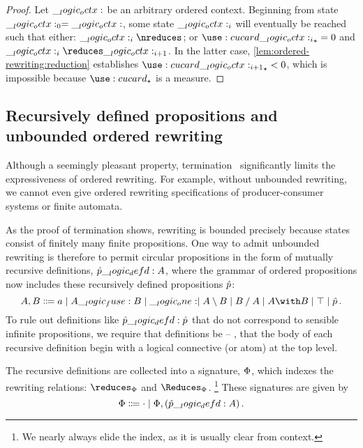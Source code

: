%
\begin{proof}
  Let $\__logic_octx:$ be an arbitrary ordered context.
  Beginning from state $\__logic_octx:_0 = \__logic_octx:$, some state $\__logic_octx:_i$ will eventually be reached such that either: $\octx_i \nreduces$; or $\card{\octx_i}_{\star} = 0$ and $\octx_i \reduces \octx_{i+1}$.
  In the latter case, \cref{lem:ordered-rewriting:reduction} establishes $\card{\octx_{i+1}}_{\star} < 0$, which is impossible because $\card{}_{\star}$ is a measure.
\end{proof}


\subsection{Recursively defined propositions and unbounded ordered rewriting}

Although a seemingly pleasant property, termination~ significantly limits the expressiveness of ordered rewriting.
For example, without unbounded rewriting, we cannot even give ordered rewriting specifications of producer-consumer systems or finite automata.

As the proof of termination shows, rewriting is bounded
precisely because
states
consist of finitely many finite propositions.
One way to admit unbounded rewriting is therefore to permit circular propositions in the form of mutually recursive definitions, $\hat{p} \__logic_defd: A$, where the grammar of ordered propositions now includes these recursively defined propositions $\hat{p}$:
\begin{equation*}
  A,B \Coloneqq a \mid A \fuse B \mid \one \mid A \limp B \mid B \pmir A \mid A \with B \mid \top \mid \defp{p}
  \,.
\end{equation*}
To rule out definitions like $\hat{p} \__logic_defd: \hat{p}$ that do not correspond to sensible infinite propositions, we require that definitions be \autocite{Gay+Hole:AI05} -- \ie, that the body of each recursive definition begin with a logical connective (or atom) at the top level.

The recursive definitions are collected into a signature, $\Phi$, which indexes the rewriting relations: $\reduces_{\orsig}$ and $\Reduces_{\orsig}$.%
\footnote{We nearly always elide the index, as it is usually clear from context.} 
These signatures are given by
\begin{equation*}
  \Phi \Coloneqq \cdot \mid \Phi , (\hat{p} \__logic_defd: A)
  \,.
\end{equation*}


